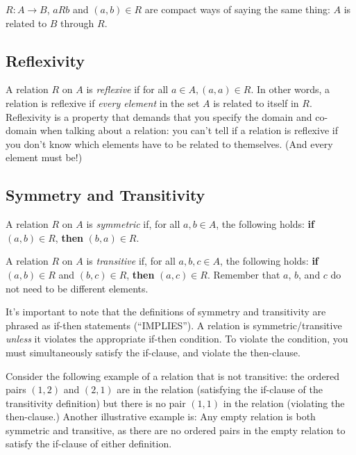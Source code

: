 \documentclass[12pt,letterpaper]{article}
\newcommand\Z{\mathbb Z}
\begin{document}
    $R: A \rightarrow B$, $a R b$ and $(a,b) \in R$ are compact ways of saying the same thing: $A$ is related to $B$ through $R$.
    
    
    \subsection{Reflexivity}
    
    A relation $R$ on $A$ is \textit{reflexive} if for all $a \in A, (a,a) \in R$. In other words, a relation is reflexive if \emph{every element} in the set $A$ is related to itself in $R$. Reflexivity is a property that demands that you specify the domain and co-domain when talking about a relation: you can't tell if a relation is reflexive if you don't know which elements have to be related to themselves. (And every element must be!)

    \subsection{Symmetry and Transitivity}
    A relation $R$ on $A$ is \textit{symmetric} if, for all $a,b \in A$, the following holds: \textbf{if} $(a,b) \in R$, \textbf{then} $(b,a) \in R$. 
    
    A relation $R$ on $A$ is \textit{transitive} if, for all $a,b,c \in A$, the following holds: \textbf{if} $(a,b) \in R$ and $(b,c) \in R$, \textbf{then} $(a,c) \in R$. Remember that $a$, $b$, and $c$ do not need to be different elements.
    
    It's important to note that the definitions of symmetry and transitivity are phrased as if-then statements (``IMPLIES''). A relation is symmetric/transitive \emph{unless} it violates the appropriate if-then condition. To violate the condition, you must simultaneously satisfy the if-clause, and violate the then-clause. 
    
    Consider the following example of a relation that is not transitive: the ordered pairs $(1,2)$ and $(2,1)$ are in the relation (satisfying the if-clause of the transitivity definition) but there is no pair $(1,1)$ in the relation (violating the then-clause.) Another illustrative example is: Any empty relation is both symmetric and transitive, as there are no ordered pairs in the empty relation to satisfy the if-clause of either definition.
    
\end{document}
